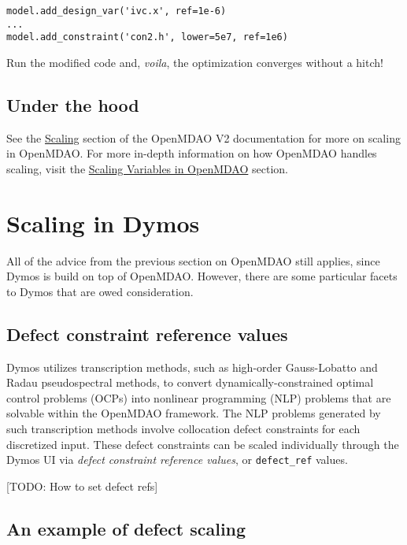 \documentclass{article}
\begin{document}
\begin{lstlisting}[frame=single, backgroundcolor=\color{mygray}]
model.add_design_var('ivc.x', ref=1e-6)
...
model.add_constraint('con2.h', lower=5e7, ref=1e6)
\end{lstlisting}
\noindent
Run the modified code and, \textit{voila}, the optimization converges without a hitch!

\subsection*{Under the hood}

See the \href{http://openmdao.org/twodocs/versions/latest/tags/Scaling.html}{Scaling} section of the OpenMDAO V2 documentation for more on scaling in OpenMDAO. For more in-depth information on how OpenMDAO handles scaling, visit the \href{http://openmdao.org/twodocs/versions/latest/theory_manual/scaling.html}{Scaling Variables in OpenMDAO} section.

\newpage
\section{Scaling in Dymos}

All of the advice from the previous section on OpenMDAO still applies, since Dymos is build on top of OpenMDAO. However, there are some particular facets to Dymos that are owed consideration.

\subsection*{Defect constraint reference values}

Dymos utilizes transcription methods, such as high-order Gauss-Lobatto and Radau pseudospectral methods, to convert dynamically-constrained optimal control problems (OCPs) into nonlinear programming (NLP) problems that are solvable within the OpenMDAO framework. The NLP problems generated by such transcription methods involve collocation defect constraints for each discretized input. These defect constraints can be scaled individually through the Dymos UI via \textit{defect constraint reference values}, or \texttt{defect\_ref} values.

[TODO: How to set defect refs]

\subsection*{An example of defect scaling}
\end{document}

